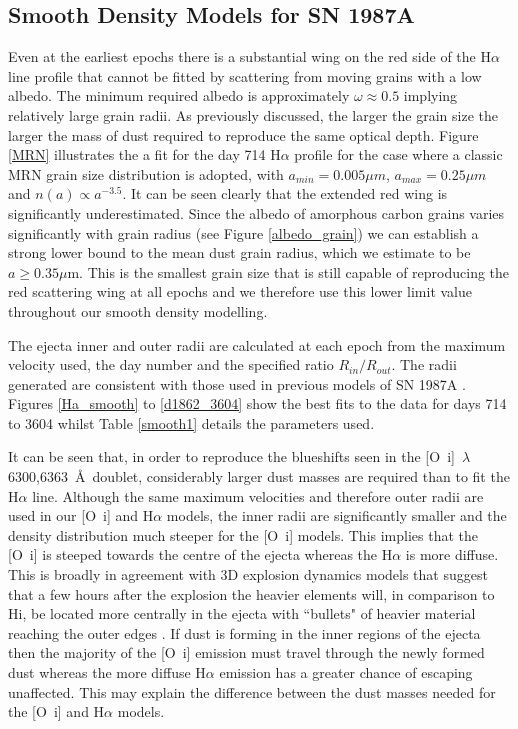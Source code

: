\documentclass[useAMS,usenatbib,usegraphicx]{mnras}
\begin{document}
\subsection{Smooth Density Models for SN 1987A}
\label{smooth_models}

Even at the earliest epochs there is a substantial wing on the red side of 
the H$\alpha$ line profile that cannot be fitted by scattering from moving grains with a low albedo.  The 
minimum required albedo is approximately $\omega \approx 0.5$ implying relatively large grain radii.  As previously discussed, the larger 
the grain size the larger the mass of dust required to reproduce the same 
optical depth.  Figure \ref{MRN} illustrates the 
a fit for the day 714 H$\alpha$ profile for the case where a classic MRN \citep{Mathis1977} grain size 
distribution is adopted, with $a_{min}=0.005 \mu m$, $a_{max}=0.25 \mu m$ 
and $n(a) \propto a^{-3.5}$.  It can be seen clearly that the extended red wing is 
significantly underestimated.  Since the albedo of  
amorphous carbon grains varies significantly with grain radius (see Figure \ref{albedo_grain}) we can establish a strong 
lower bound to the mean dust grain radius, which we estimate to be $a \ge 0.35\mu$m.  This is the smallest grain size that is still 
capable of reproducing the red scattering wing at all epochs and we 
therefore use this lower limit value throughout our smooth density modelling.

The ejecta inner and outer radii are calculated at each epoch from the maximum 
velocity used, the day number and the specified ratio $R_{in}/R_{out}$.  
The radii generated are consistent with those used in previous models of 
SN 1987A \citep{Ercolano2007, Wesson2015}.  Figures \ref{Ha_smooth} to 
\ref{d1862_3604} show the best fits to the data for days 714 to 3604 whilst 
Table \ref{smooth1} details the parameters used.

It can be seen that, in order to reproduce the blueshifts seen in the 
[O~{\sc i}]~$\lambda$6300,6363~\AA\ doublet, considerably larger dust masses 
are required than to fit the H$\alpha$ line.  Although the same maximum velocities and therefore outer radii are used in our [O~{\sc i}] and H$\alpha$ models, the inner radii are significantly smaller and the density distribution much steeper for the [O~{\sc i}] models.  This implies that the [O~{\sc i}] is steeped towards the centre of the ejecta whereas the H$\alpha$ is more diffuse.  This is broadly in agreement with 3D explosion dynamics models that suggest that a few hours after the explosion the heavier elements will, in comparison to H{\sc i}, be located more centrally in the ejecta with ``bullets" of heavier material reaching the outer edges  \citep{Hammer2009}.  If dust is forming in the inner regions of the ejecta then the majority of the  [O~{\sc i}] emission must travel through the newly formed dust whereas the more diffuse H$\alpha$ emission has a greater chance of escaping unaffected.  This may explain the difference between the dust masses needed for the [O~{\sc i}] and H$\alpha$ models.
\end{document}
